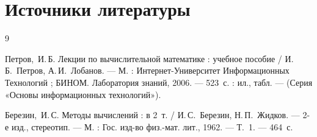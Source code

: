 \section{Источники литературы}

\vglue-32pt
\begin{thebibliography}{9}

Петров,~И.\,Б. Лекции по вычислительной математике : учебное пособие / И.\,Б.~Петров, А.\,И.~Лобанов. --- М. : Интернет-Университет Информационных Технологий ; БИНОМ. Лаборатория знаний, 2006. --- 523~с. : ил., табл. --- (Серия «Основы информационных технологий»).

Березин,~И.\,С. Методы вычислений : в 2~т. / И.\,С.~Березин, Н.\,П.~Жидков. --- 2-е изд., стереотип. --- М. : Гос. изд-во физ.-мат. лит., 1962. --- Т.~1. --- 464~с.

\end{thebibliography}